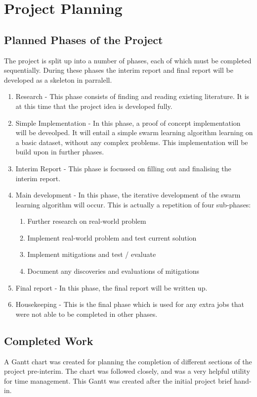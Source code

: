 \chapter{Project Planning}

\section{Planned Phases of the Project}
The project is split up into a number of phases, each of which must be completed sequentially. During these phases the interim report and final report will be developed as a skeleton in parralell.
\begin{enumerate}
	\item Research - This phase consists of finding and reading existing literature. It is at this time that the project idea is developed fully.
	\item Simple Implementation - In this phase, a proof of concept implementation will be deveolped. It will entail a simple swarm learning algorithm learning on a basic dataset, without any complex problems. This implementation will be build upon in further phases.
	\item Interim Report - This phase is focussed on filling out and finalising the interim report.
	\item Main development - In this phase, the iterative development of the swarm learning algorithm will occur. This is actually a repetition of four sub-phases:
	\begin{enumerate}
		\item Further research on real-world problem
		\item Implement real-world problem and test current solution
		\item Implement mitigations and test / evaluate
		\item Document any discoveries and evaluations of mitigations
	\end{enumerate}
	\item Final report - In this phase, the final report will be written up.
	\item Housekeeping - This is the final phase which is used for any extra jobs that were not able to be completed in other phases.
\end{enumerate}



\section{Completed Work}
A Gantt chart was created for planning the completion of different sections of the project pre-interim. The chart was followed closely, and was a very helpful utility for time management. This Gantt was created after the initial project brief hand-in.

